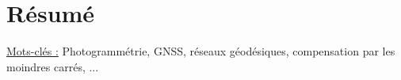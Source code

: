 
\chapter*{Résumé}
\thispagestyle{empty}
\lipsum[1-4]

\vspace{1cm}
\underline{Mots-clés :} Photogrammétrie, GNSS, réseaux géodésiques, compensation par les moindres carrés, ...